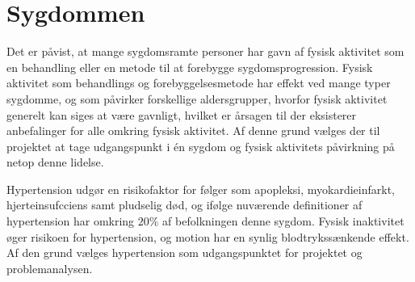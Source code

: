 \section{Sygdommen}
Det er påvist, at mange sygdomsramte personer har gavn af fysisk aktivitet som en behandling eller en metode til at forebygge sygdomsprogression. \cite{motionsraad2007,pedersen2011} Fysisk aktivitet som behandlings og forebyggelsesmetode har effekt ved mange typer sygdomme, og som påvirker forskellige aldersgrupper, hvorfor fysisk aktivitet generelt kan siges at være gavnligt, hvilket er årsagen til der eksisterer anbefalinger for alle omkring fysisk aktivitet. \cite{pedersen2011} Af denne grund vælges der til projektet at tage udgangspunkt i én sygdom og fysisk aktivitets påvirkning på netop denne lidelse.

Hypertension udgør en risikofaktor for følger som apopleksi, myokardieinfarkt, hjerteinsufcciens samt pludselig død, og ifølge nuværende definitioner af hypertension har omkring $20\%$ af befolkningen denne sygdom. \cite{pedersen2011} Fysisk inaktivitet øger risikoen for hypertension, og motion har en synlig blodtrykssænkende effekt. \cite{olsen2015} Af den grund vælges hypertension som udgangspunktet for projektet og problemanalysen. 